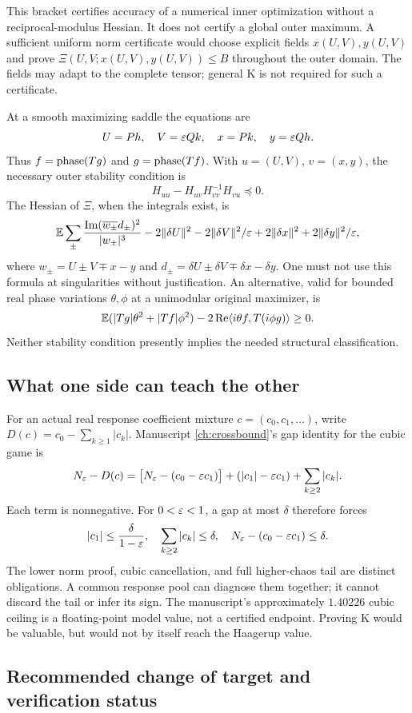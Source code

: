 This bracket certifies accuracy of a numerical inner optimization
without a reciprocal-modulus Hessian. It does not certify a global
outer maximum. A sufficient uniform norm certificate would choose
explicit fields \(x(U,V),y(U,V)\) and prove
\(\Xi(U,V;x(U,V),y(U,V))\le B\) throughout the outer domain.
The fields may adapt to the complete tensor; general K is not
required for such a certificate.

At a smooth maximizing saddle the equations are
\[
U=Ph,\quad V=\varepsilon Qk,\quad x=Pk,\quad y=\varepsilon Qh.
\]
Thus \(f=\operatorname{phase}(Tg)\) and \(g=\operatorname{phase}(Tf)\).
With \(u=(U,V)\), \(v=(x,y)\), the necessary outer stability condition is
\[
H_{uu}-H_{uv}H_{vv}^{-1}H_{vu}\preceq0.
\]
The Hessian of \(\Xi\), when the integrals exist, is
\[
\mathbb E\sum_{\pm}\frac{\operatorname{Im}(\overline{w_\pm}d_\pm)^2}{|w_\pm|^3}
-2\|\delta U\|^2-2\|\delta V\|^2/\varepsilon
+2\|\delta x\|^2+2\|\delta y\|^2/\varepsilon,
\]
where \(w_\pm=U\pm V\mp x-y\) and
\(d_\pm=\delta U\pm\delta V\mp\delta x-\delta y\).
One must not use this formula at singularities without justification.
An alternative, valid for bounded real phase variations
\(\theta,\phi\) at a unimodular original maximizer, is
\[
\mathbb E(|Tg|\theta^2+|Tf|\phi^2)
-2\operatorname{Re}\langle i\theta f,T(i\phi g)\rangle\ge0.
\]
Neither stability condition presently implies the needed structural
classification.

\subsection{What one side can teach the other}

For an actual real response coefficient mixture \(c=(c_0,c_1,\ldots)\),
write \(D(c)=c_0-\sum_{k\ge1}|c_k|\). Manuscript \autoref{ch:crossbound}'s gap
identity for the cubic game is
\[
N_\varepsilon-D(c)
=\bigl[N_\varepsilon-(c_0-\varepsilon c_1)\bigr]
 +(|c_1|-\varepsilon c_1)+\sum_{k\ge2}|c_k|.
\]
Each term is nonnegative. For \(0<\varepsilon<1\), a gap at most \(\delta\)
therefore forces
\[
|c_1|\le\frac{\delta}{1-\varepsilon},\quad
\sum_{k\ge2}|c_k|\le\delta,\quad
N_\varepsilon-(c_0-\varepsilon c_1)\le\delta.
\]
The lower norm proof, cubic cancellation, and full higher-chaos tail
are distinct obligations. A common response pool can diagnose them
together; it cannot discard the tail or infer its sign.
The manuscript's approximately \(1.40226\) cubic ceiling is a
floating-point model value, not a certified endpoint. Proving K
would be valuable, but would not by itself reach the Haagerup value.

\subsection{Recommended change of target and verification status}

